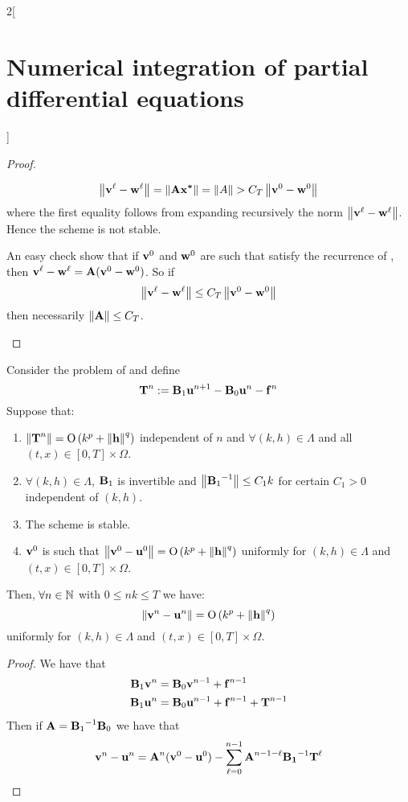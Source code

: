 \documentclass[../../../main_math.tex]{subfiles}
\begin{document}
\begin{multicols}{2}[\section{Numerical integration of partial differential equations}]
\begin{proof}
\begin{itemizeiff}
      \begin{multline*}
        \norm{\vf{v}^\ell -\vf{w}^\ell}= \norm{\vf{A} \vf{x^*}}=\norm{A}>C_T\norm{\vf{v}^0-\vf{w}^0}
      \end{multline*}
      where the first equality follows from expanding recursively the norm $\left\|\boldsymbol{\mathrm{v}}^\ell -\boldsymbol{\mathrm{w}}^\ell\right\|$. Hence the scheme is not stable.
      \item An easy check show that if $\boldsymbol{\mathrm{v}}^0$ and $\boldsymbol{\mathrm{w}}^0$ are such that satisfy the recurrence of , then ${\boldsymbol{\mathrm{v}}^\ell -\boldsymbol{\mathrm{w}}^\ell}=\boldsymbol{\mathrm{A}}(\boldsymbol{\mathrm{v}}^0-\boldsymbol{\mathrm{w}}^0)$. So if
      $$
        \left\|\boldsymbol{\mathrm{v}}^\ell -\boldsymbol{\mathrm{w}}^\ell\right\|\leq C_T\left\|\boldsymbol{\mathrm{v}}^0-\boldsymbol{\mathrm{w}}^0\right\|
      $$
      then necessarily $\left\|\boldsymbol{\mathrm{A}}\right\|\leq C_T$.
    \end{itemizeiff}
  \end{proof}
  \begin{theorem}
    Consider the problem of  and define
    $$
      \boldsymbol{\mathrm{T}}^n:=\boldsymbol{\mathrm{B}}_1\boldsymbol{\mathrm{u}}^{n+1}-\boldsymbol{\mathrm{B}}_0\boldsymbol{\mathrm{u}}^n -\boldsymbol{\mathrm{f}}^n
    $$
    Suppose that:
    \begin{enumerate}
      \item $\left\|\boldsymbol{\mathrm{T}}^n\right\|=\mathrm{O}\left(k^p+\left\|\boldsymbol{\mathrm{h}}\right\|^q\right)$ independent of $n$ and $\forall (k,h)\in\Lambda$ and all $(t,x)\in[0,T]\times\Omega$.
      \item $\forall (k,h)\in\Lambda$, $\boldsymbol{\mathrm{B}}_1$ is invertible and $\left\|{\boldsymbol{\mathrm{B}}_1}^{-1}\right\|\leq C_1k$ for certain $C_1>0$ independent of $(k,h)$.
      \item The scheme is stable.
      \item $\boldsymbol{\mathrm{v}}^0$ is such that $\left\|\boldsymbol{\mathrm{v}}^0-\boldsymbol{\mathrm{u}}^0\right\|=\mathrm{O}\left(k^p+\left\|\boldsymbol{\mathrm{h}}\right\|^q\right)$ uniformly for $(k,h)\in\Lambda$ and $(t,x)\in[0,T]\times\Omega$.
    \end{enumerate}
    Then, $\forall n\in\mathbb{N}$ with $0\leq nk\leq T$ we have:
    $$
      \left\|\boldsymbol{\mathrm{v}}^n-\boldsymbol{\mathrm{u}}^n\right\|=\mathrm{O}\left(k^p+\left\|\boldsymbol{\mathrm{h}}\right\|^q\right)
    $$
    uniformly for $(k,h)\in\Lambda$ and $(t,x)\in[0,T]\times\Omega$.
  \end{theorem}
  \begin{proof}
    We have that
    \begin{align*}
      \boldsymbol{\mathrm{B}}_1\boldsymbol{\mathrm{v}}^{n} & =\boldsymbol{\mathrm{B}}_0\boldsymbol{\mathrm{v}}^{n-1}+\boldsymbol{\mathrm{f}}^{n-1}               \\
      \boldsymbol{\mathrm{B}}_1\boldsymbol{\mathrm{u}}^{n} & =\boldsymbol{\mathrm{B}}_0\boldsymbol{\mathrm{u}}^{n-1} +\boldsymbol{\mathrm{f}}^{n-1}+\boldsymbol{\mathrm{T}}^{n-1}
    \end{align*}
    Then if $\boldsymbol{\mathrm{A}}= {\boldsymbol{\mathrm{B}}_1}^{-1}\boldsymbol{\mathrm{B}}_0$ we have that
    $$\boldsymbol{\mathrm{v}}^n-\boldsymbol{\mathrm{u}}^n=\boldsymbol{\mathrm{A}}^n(\boldsymbol{\mathrm{v}}^0-\boldsymbol{\mathrm{u}}^0)-\sum_{\ell=0}^{n-1}\boldsymbol{\mathrm{A}}^{n-1-\ell}{\boldsymbol{\mathrm{B_1}}}^{-1}\boldsymbol{\mathrm{T}}^\ell$$

\end{proof}
\end{multicols}
\end{document}
